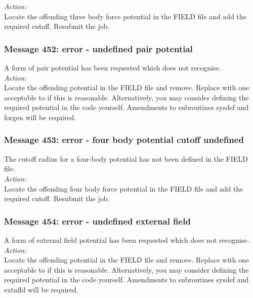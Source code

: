 \noindent
{\em Action:}\\
Locate the offending three body force potential in the FIELD file and add the
required cutoff. Resubmit the job.\\

\subsubsection*{Message 452: error - undefined pair potential}

A form of pair potential has been requested which
\D{} does not recognise.  \\

\noindent
{\em Action:} \\ 
Locate the offending potential in the FIELD file and
remove. Replace with one acceptable to \D{} if this is
reasonable. Alternatively, you may consider defining the required
potential in the code yourself. Amendments to subroutines {\sc sysdef}
and {\sc forgen} will be required.

\subsubsection*{Message 453: error - four body potential cutoff undefined}

The cutoff radius for a four-body  potential has not been defined in
the FIELD file.\\

\noindent
{\em Action:}\\
Locate the offending four body force potential in the FIELD file and add the
required cutoff. Resubmit the job.\\

\subsubsection*{Message 454: error - undefined external field}

A form of external field potential has been requested which
\D{} does not recognise.  \\

\noindent
{\em Action:} \\ Locate the offending potential in the FIELD file and
remove. Replace with one acceptable to \D{} if this is
reasonable. Alternatively, you may consider defining the required
potential in the code yourself. Amendments to subroutines {\sc sysdef}
and {\sc extnfld} will be required.

